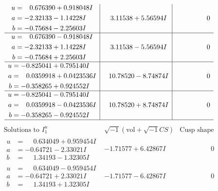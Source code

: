 \documentclass[1p]{elsarticle_modified}
\theoremstyle{definition}
\newcommand{\I}{\sqrt{-1}}
\begin{document}
$$\begin{array}{c|c|c}
\begin{aligned}
u &= \phantom{-}0.676390 + 0.918048 I \\
a &= -2.32133 - 1.14228 I \\
b &= -0.75684 - 2.25603 I\end{aligned}
 & \phantom{-}3.11538 + 5.56594 I & \phantom{-0.000000 } 0 \\ \hline\begin{aligned}
u &= \phantom{-}0.676390 - 0.918048 I \\
a &= -2.32133 + 1.14228 I \\
b &= -0.75684 + 2.25603 I\end{aligned}
 & \phantom{-}3.11538 - 5.56594 I & \phantom{-0.000000 } 0 \\ \hline\begin{aligned}
u &= -0.825041 + 0.795140 I \\
a &= \phantom{-}0.0359918 + 0.0423536 I \\
b &= -0.358265 + 0.924552 I\end{aligned}
 & \phantom{-}10.78520 - 8.74874 I & \phantom{-0.000000 } 0 \\ \hline\begin{aligned}
u &= -0.825041 - 0.795140 I \\
a &= \phantom{-}0.0359918 - 0.0423536 I \\
b &= -0.358265 - 0.924552 I\end{aligned}
 & \phantom{-}10.78520 + 8.74874 I & \phantom{-0.000000 } 0\\
 \hline 
 \end{array}$$\newpage$$\begin{array}{c|c|c}  
\text{Solutions to }I^u_{1}& \I (\text{vol} + \sqrt{-1}CS) & \text{Cusp shape}\\
 \hline 
\begin{aligned}
u &= \phantom{-}0.634049 + 0.959454 I \\
a &= -0.64721 - 2.33021 I \\
b &= \phantom{-}1.34193 - 1.32305 I\end{aligned}
 & -1.71577 + 6.42867 I & \phantom{-0.000000 } 0 \\ \hline\begin{aligned}
u &= \phantom{-}0.634049 - 0.959454 I \\
a &= -0.64721 + 2.33021 I \\
b &= \phantom{-}1.34193 + 1.32305 I\end{aligned}
 & -1.71577 - 6.42867 I & \phantom{-0.000000 } 0 \\ \hline\begin{aligned}

\end{aligned}
\end{array}$$
\end{document}
